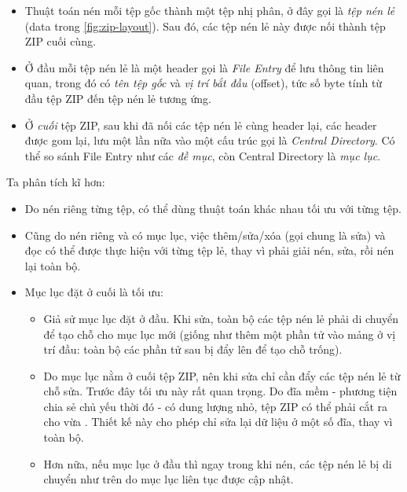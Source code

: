 \documentclass[../../thesis]{subfiles}
\begin{document}
\begin{itemize}
    \item
        Thuật toán nén mỗi tệp gốc thành một tệp nhị phân, ở đây gọi là
        \emph{tệp nén lẻ} (data trong \autoref{fig:zip-layout}). Sau đó, các tệp
        nén lẻ này được nối thành tệp ZIP cuối cùng.
    \item
        Ở đầu mỗi tệp nén lẻ là một header gọi là \emph{File Entry} để lưu thông
        tin liên quan, trong đó có \emph{tên tệp gốc} và \emph{vị trí bắt đầu}
        (offset), tức số byte tính từ đầu tệp ZIP đến tệp nén lẻ tương ứng.
    \item
        Ở \emph{cuối} tệp ZIP, sau khi đã nối các tệp nén lẻ cùng header lại,
        các header được gom lại, lưu một lần nữa vào một cấu trúc gọi là
        \emph{Central Directory}. Có thể so sánh File Entry như các \emph{đề
        mục}, còn Central Directory là \emph{mục lục}.
\end{itemize}

Ta phân tích kĩ hơn:

\begin{itemize}
    \item
        Do nén riêng từng tệp, có thể dùng thuật toán khác nhau tối ưu với từng
        tệp.
    \item
        Cũng do nén riêng và có mục lục, việc thêm/sửa/xóa (gọi chung là sửa) và
        đọc có thể được thực hiện với từng tệp lẻ, thay vì phải giải nén, sửa,
        rồi nén lại toàn bộ.
\end{itemize}

\begin{itemize}[resume, before = \vspace*{-\dimexpr\topsep+\partopsep\relax}]
    \item
        Mục lục đặt ở cuối là tối ưu:

        \begin{itemize}
            \item
                Giả sử mục lục đặt ở đầu. Khi sửa, toàn bộ các tệp nén lẻ phải
                di chuyển để tạo chỗ cho mục lục mới (giống như thêm một phần tử
                vào mảng ở vị trí đầu: toàn bộ các phần tử sau bị đẩy lên để tạo
                chỗ trống).
            \item
                Do mục lục nằm ở cuối tệp ZIP, nên khi sửa chỉ cần đẩy các tệp
                nén lẻ từ chỗ sửa. Trước đây tối ưu này rất quan trọng. Do đĩa
                mềm - phương tiện chia sẻ chủ yếu thời đó - có dung lượng nhỏ,
                tệp ZIP có thể phải cắt ra cho vừa \cite{WIKI_ZIP}. Thiết kế này
                cho phép chỉ sửa lại dữ liệu ở một số đĩa, thay vì toàn bộ.
            \item
                Hơn nữa, nếu mục lục ở đầu thì ngay trong khi nén, các tệp nén
                lẻ bị di chuyển như trên do mục lục liên tục được cập nhật.
        \end{itemize}
\end{itemize}
\end{document}
